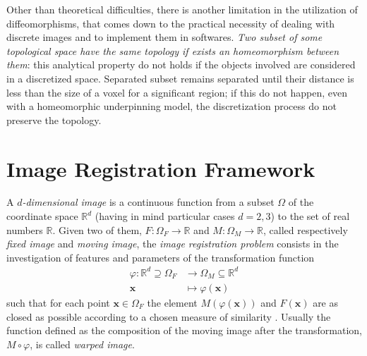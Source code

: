 
Other than theoretical difficulties, there is another limitation in the utilization of diffeomorphisms, that comes down to the practical necessity of dealing with discrete images and to implement them in softwares. \emph{Two subset of some topological space have the same topology if exists an homeomorphism between them}: this analytical property do not holds if the objects involved are considered in a discretized space. Separated subset remains separated until their distance is less than the size of a voxel for a significant region; if this do not happen, even with a homeomorphic underpinning model, the discretization process do not preserve the topology.



\section{Image Registration Framework}\label{se:registration_framework}

A \emph{$d$-dimensional image} is a continuous function from a subset $\Omega$ of the coordinate space $\mathbb{R}^{d}$ (having in mind particular cases $d=2,3$) to the set of real numbers $\mathbb{R}$. Given two of them, $F : \Omega_{F}  \rightarrow\mathbb{R} $ and $M : \Omega_{M}  \rightarrow\mathbb{R} $, called respectively \emph{fixed image} and \emph{moving image}, the \emph{image registration problem} consists in the investigation of features and parameters of the transformation function
\begin{align*}
\varphi :\mathbb{R}^{d} \supseteq \Omega_{F} & \longrightarrow \Omega_{M}\subseteq \mathbb{R}^{d}   \\
\mathbf{x} &\longmapsto \varphi (\mathbf{x}) 
\end{align*}
such that for each point $\mathbf{x}\in \Omega_{F} $ the element $M(\varphi (\mathbf{x}))$ and $F(\mathbf{x})$ are as closed as possible according to a chosen measure of similarity \cite{trouve1998diffeomorphisms}. Usually the function defined as the composition of the moving image after the transformation, $M\circ\varphi $, is called \emph{warped image}.\\

